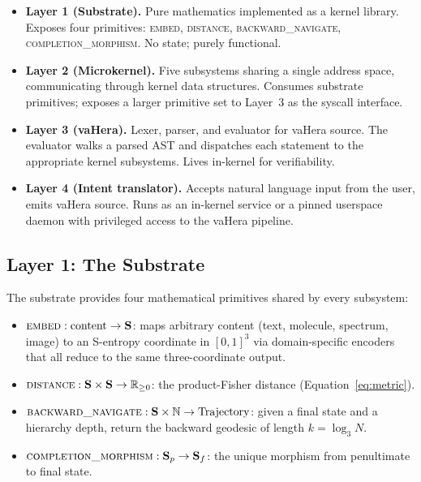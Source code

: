 \documentclass[11pt,twocolumn,a4paper]{article}
\newcommand{\Scoord}{\mathbf{S}}
\begin{document}
\begin{itemize}[leftmargin=*]
\item \textbf{Layer 1 (Substrate).} Pure mathematics implemented as a kernel library. Exposes four primitives: \textsc{embed}, \textsc{distance}, \textsc{backward\_navigate}, \textsc{completion\_morphism}. No state; purely functional.

\item \textbf{Layer 2 (Microkernel).} Five subsystems sharing a single address space, communicating through kernel data structures. Consumes substrate primitives; exposes a larger primitive set to Layer~3 as the syscall interface.

\item \textbf{Layer 3 (vaHera).} Lexer, parser, and evaluator for vaHera source. The evaluator walks a parsed AST and dispatches each statement to the appropriate kernel subsystems. Lives in-kernel for verifiability.

\item \textbf{Layer 4 (Intent translator).} Accepts natural language input from the user, emits vaHera source. Runs as an in-kernel service or a pinned userspace daemon with privileged access to the vaHera pipeline.
\end{itemize}

\subsection{Layer 1: The Substrate}

The substrate provides four mathematical primitives shared by every subsystem:

\begin{itemize}[leftmargin=*]
\item $\textsc{embed}: \text{content} \to \Scoord$: maps arbitrary content (text, molecule, spectrum, image) to an S-entropy coordinate in $[0,1]^3$ via domain-specific encoders that all reduce to the same three-coordinate output.
\item $\textsc{distance}: \Scoord \times \Scoord \to \mathbb{R}_{\geq 0}$: the product-Fisher distance (Equation~\ref{eq:metric}).
\item $\textsc{backward\_navigate}: \Scoord \times \mathbb{N} \to \text{Trajectory}$: given a final state and a hierarchy depth, return the backward geodesic of length $k = \log_3 N$.
\item $\textsc{completion\_morphism}: \Scoord_p \to \Scoord_f$: the unique morphism from penultimate to final state.
\end{itemize}
\end{document}
